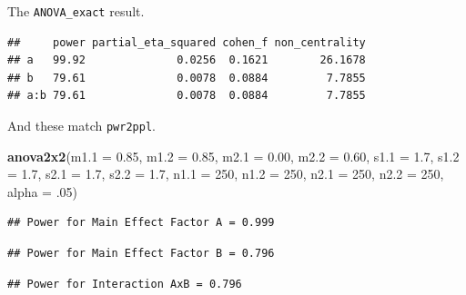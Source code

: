 \documentclass[]{book}
\newenvironment{Shaded}{\begin{snugshade}}{\end{snugshade}}
\newcommand{\DataTypeTok}[1]{\textcolor[rgb]{0.13,0.29,0.53}{#1}}
\newcommand{\DecValTok}[1]{\textcolor[rgb]{0.00,0.00,0.81}{#1}}
\newcommand{\FloatTok}[1]{\textcolor[rgb]{0.00,0.00,0.81}{#1}}
\newcommand{\KeywordTok}[1]{\textcolor[rgb]{0.13,0.29,0.53}{\textbf{#1}}}
\newcommand{\NormalTok}[1]{#1}
\newcommand{\OperatorTok}[1]{\textcolor[rgb]{0.81,0.36,0.00}{\textbf{#1}}}
\newcommand{\OtherTok}[1]{\textcolor[rgb]{0.56,0.35,0.01}{#1}}
\newcommand{\StringTok}[1]{\textcolor[rgb]{0.31,0.60,0.02}{#1}}
\begin{document}
The \texttt{ANOVA\_exact} result.

\begin{Shaded}
\end{Shaded}

\begin{verbatim}
##     power partial_eta_squared cohen_f non_centrality
## a   99.92              0.0256  0.1621        26.1678
## b   79.61              0.0078  0.0884         7.7855
## a:b 79.61              0.0078  0.0884         7.7855
\end{verbatim}

And these match \texttt{pwr2ppl}.

\begin{Shaded}
\begin{Highlighting}[]
\KeywordTok{anova2x2}\NormalTok{(}\DataTypeTok{m1.1 =} \FloatTok{0.85}\NormalTok{, }\DataTypeTok{m1.2 =} \FloatTok{0.85}\NormalTok{, }\DataTypeTok{m2.1 =} \FloatTok{0.00}\NormalTok{, }\DataTypeTok{m2.2 =} \FloatTok{0.60}\NormalTok{,}
         \DataTypeTok{s1.1 =} \FloatTok{1.7}\NormalTok{, }\DataTypeTok{s1.2 =} \FloatTok{1.7}\NormalTok{, }\DataTypeTok{s2.1 =} \FloatTok{1.7}\NormalTok{, }\DataTypeTok{s2.2 =} \FloatTok{1.7}\NormalTok{,}
         \DataTypeTok{n1.1 =} \DecValTok{250}\NormalTok{, }\DataTypeTok{n1.2 =} \DecValTok{250}\NormalTok{, }\DataTypeTok{n2.1 =} \DecValTok{250}\NormalTok{, }\DataTypeTok{n2.2 =} \DecValTok{250}\NormalTok{,}
         \DataTypeTok{alpha =} \FloatTok{.05}\NormalTok{)}
\end{Highlighting}
\end{Shaded}

\begin{verbatim}
## Power for Main Effect Factor A = 0.999
\end{verbatim}

\begin{verbatim}
## Power for Main Effect Factor B = 0.796
\end{verbatim}

\begin{verbatim}
## Power for Interaction AxB = 0.796
\end{verbatim}
\end{document}
